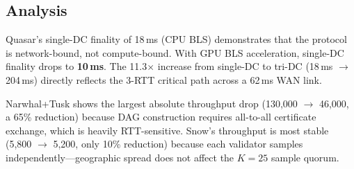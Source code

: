 \subsection{Analysis}

Quasar's single-DC finality of 18\,ms (CPU BLS) demonstrates that the protocol is
network-bound, not compute-bound. With GPU BLS acceleration, single-DC finality
drops to \textbf{10\,ms}. The 11.3$\times$ increase from single-DC to tri-DC
(18\,ms $\to$ 204\,ms) directly reflects the 3-RTT critical path across a 62\,ms
WAN link.

Narwhal+Tusk shows the largest absolute throughput drop (130{,}000 $\to$ 46{,}000, a
65\% reduction) because DAG construction requires all-to-all certificate exchange, which
is heavily RTT-sensitive. Snow's throughput is most stable (5{,}800 $\to$ 5{,}200, only
10\% reduction) because each validator samples independently---geographic spread does not
affect the $K=25$ sample quorum.

